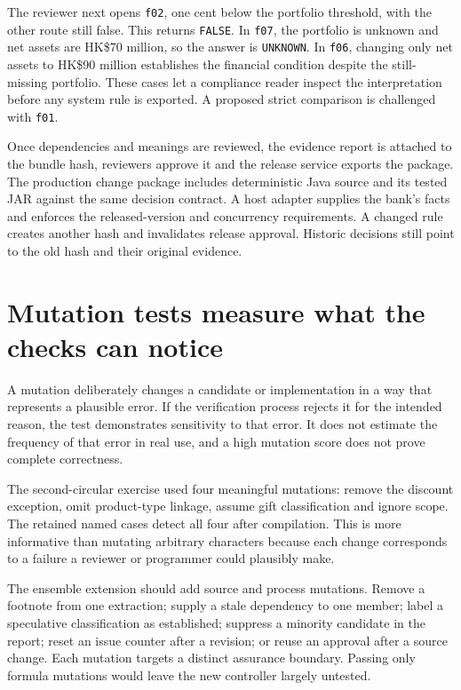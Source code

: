 
The reviewer next opens \texttt{f02}, one cent below the portfolio threshold,
with the other route still false. This returns \texttt{FALSE}. In \texttt{f07},
the portfolio is unknown and net assets are HK\$70 million, so the answer is
\texttt{UNKNOWN}. In \texttt{f06}, changing only net assets to HK\$90 million
establishes the financial condition despite the still-missing portfolio. These
cases let a compliance reader inspect the interpretation before any system rule
is exported. A proposed strict comparison is challenged with \texttt{f01}.

Once dependencies and meanings are reviewed, the evidence report is attached to
the bundle hash, reviewers approve it and the release service exports the package.
The production change package includes deterministic Java source and its tested
JAR against the same decision contract. A host adapter supplies the bank's
facts and enforces the released-version and concurrency requirements.
A changed rule creates another hash and invalidates release approval. Historic
decisions still point to the old hash and their original evidence.

\section{Mutation tests measure what the checks can notice}
\label{merge:M07:06}


A mutation deliberately changes a candidate or implementation in a way that
represents a plausible error. If the verification process rejects it for the
intended reason, the test demonstrates sensitivity to that error. It does not
estimate the frequency of that error in real use, and a high mutation score does
not prove complete correctness.

The second-circular exercise used four meaningful mutations: remove the discount
exception, omit product-type linkage, assume gift classification and ignore scope.
The retained named cases detect all four after compilation. This is more
informative than mutating arbitrary characters because each change corresponds
to a failure a reviewer or programmer could plausibly make.


The ensemble extension should add source and process mutations. Remove a footnote
from one extraction; supply a stale dependency to one member; label a speculative
classification as established; suppress a minority candidate in the report; reset
an issue counter after a revision; or reuse an approval after a source change.
Each mutation targets a distinct assurance boundary. Passing only formula
mutations would leave the new controller largely untested.

